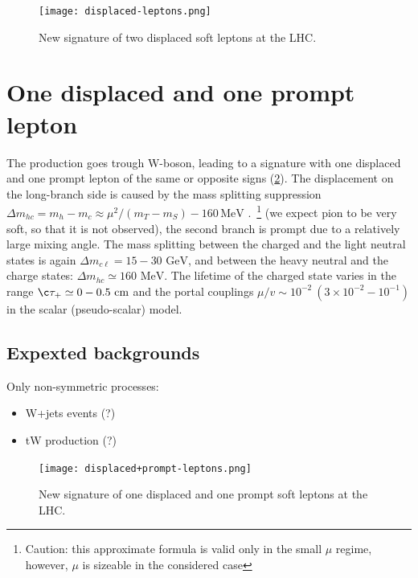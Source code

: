 \documentclass[12pt,letterpaper,notitlepage]{article}
\begin{document}
\begin{figure}[!h]
\centering
\texttt{[image: displaced-leptons.png]}
\caption{\label{fig:2displaced_diagram}New signature of two displaced soft leptons at the LHC.}
\end{figure}

\section{One displaced and one prompt lepton}

The production goes trough W-boson, leading to a signature with one displaced and one prompt lepton of the same or opposite signs (\ref{fig:2displaced_diagram}). The displacement on the long-branch side is caused by the mass splitting suppression $\Delta m_{hc} = m_h - m_c \approx \mu^2/(m_T - m_S) - 160\,\text{MeV}$ .~\footnote{Caution: this approximate formula is valid only in the small $\mu$ regime, however, $\mu$ is sizeable in the considered case} (we expect pion to be very soft, so that it is not observed), the second branch is prompt due to a relatively large mixing angle. The mass splitting between the charged and the light neutral states is again $\Delta m_{c \ell} = 15-30 \text{ GeV}$, and between the heavy neutral and the charge states: $\Delta m_{h c} \simeq 160 \text{ MeV}$. The lifetime of the charged state varies in the range $\c \tau_+ \simeq 0-0.5 \text{ cm}$ and the portal couplings $\mu/v \sim 10^{-2}\ (3\times 10^{-2}-10^{-1})$ in the scalar (pseudo-scalar) model.

\subsection{Expexted backgrounds}
Only non-symmetric processes:
\begin{itemize}
  \item W+jets events (?)
  \item tW production (?)
\end{itemize}

\begin{figure}[!h]
\centering
\texttt{[image: displaced+prompt-leptons.png]}
\caption{\label{fig:2displaced_diagram}New signature of one displaced and one prompt soft leptons at the LHC.}
\end{figure}
\end{document}
